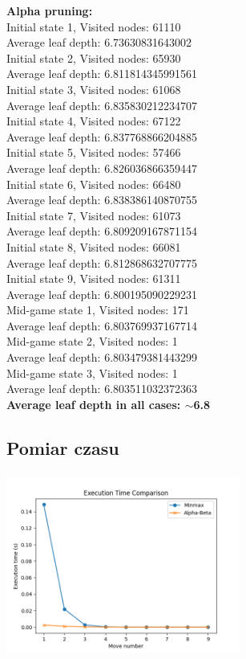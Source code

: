 \documentclass{article}
\begin{document}
\begin{minipage}[t]{1.3333\textwidth}
\smallskip
\textbf{Alpha pruning:}\\
Initial state 1, Visited nodes: 61110\\
Average leaf depth: 6.73630831643002\\
Initial state 2, Visited nodes: 65930\\
Average leaf depth: 6.811814345991561\\
Initial state 3, Visited nodes: 61068\\
Average leaf depth: 6.835830212234707\\
Initial state 4, Visited nodes: 67122\\
Average leaf depth: 6.837768866204885\\
Initial state 5, Visited nodes: 57466\\
Average leaf depth: 6.826036866359447\\
Initial state 6, Visited nodes: 66480\\
Average leaf depth: 6.838386140870755\\
Initial state 7, Visited nodes: 61073\\
Average leaf depth: 6.809209167871154\\
Initial state 8, Visited nodes: 66081\\
Average leaf depth: 6.812868632707775\\
Initial state 9, Visited nodes: 61311\\
Average leaf depth: 6.800195090229231\\
Mid-game state 1, Visited nodes: 171\\
Average leaf depth: 6.803769937167714\\
Mid-game state 2, Visited nodes: 1\\
Average leaf depth: 6.803479381443299\\
Mid-game state 3, Visited nodes: 1\\
Average leaf depth: 6.803511032372363\\
\textbf{Average leaf depth in all cases: $\sim$6.8}\\

\end{minipage}

\subsection{Pomiar czasu}

\includegraphics[width=7.7cm, height=6cm]{execution_time_comparison2.png}
\end{document}
